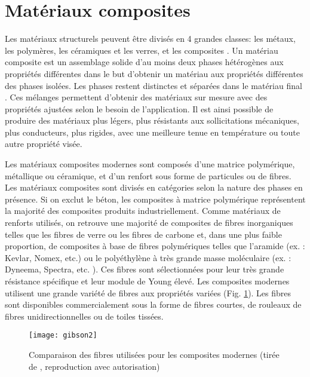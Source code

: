 \label{sec:RevLitt}

\section{Matériaux composites}

Les matériaux structurels peuvent être divisés en 4 grandes classes: les métaux, les polymères, les céramiques et les verres, et les composites \cite{ashby2018materials}. 
Un matériau composite est un assemblage solide d'au moins deux phases hétérogènes aux propriétés différentes dans le but d'obtenir un matériau aux propriétés différentes des phases isolées. 
Les phases restent distinctes et séparées dans le matériau final \cite{Wikipedia_mat_comp}. 
Ces mélanges permettent d'obtenir des matériaux sur mesure avec des propriétés ajustées selon le besoin de l'application. 
Il est ainsi possible de produire des matériaux plus légers, plus résistants aux sollicitations mécaniques, plus conducteurs, plus rigides, avec une meilleure tenue en température ou toute autre propriété visée. 

Les matériaux composites modernes sont composés d'une matrice polymérique, métallique ou céramique, et d'un renfort sous forme de particules ou de fibres. 
Les matériaux composites sont divisés en catégories selon la nature des phases en présence. 
Si on exclut le béton, les composites à matrice polymérique représentent la majorité des composites produits industriellement. 
Comme matériaux de renforts utilisés, on retrouve une majorité de composites de fibres inorganiques telles que les fibres de verre ou les fibres de carbone et, dans une plus faible proportion, de composites à base de fibres polymériques telles que l'aramide (ex. : Kevlar, Nomex, etc.) ou le polyéthylène à très grande masse moléculaire (ex. : Dyneema, Spectra, etc. ). 
Ces fibres sont sélectionnées pour leur très grande résistance spécifique et leur module de Young élevé. 
Les composites modernes utilisent une grande variété de fibres aux propriétés variées (Fig. \ref{gibson2}). 
Les fibres sont disponibles commercialement sous la forme de fibres courtes, de rouleaux de fibres unidirectionnelles ou de toiles tissées. 

\begin{figure}
	\centering
	\texttt{[image: gibson2]}
	\caption{Comparaison des fibres utilisées pour les composites modernes (tirée de \cite{Gibson2011}, reproduction avec autorisation)}
	\label{gibson2}
\end{figure}

